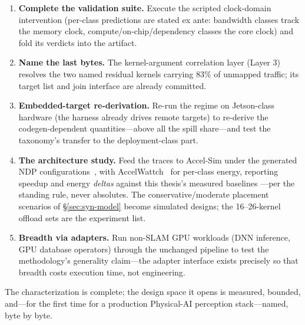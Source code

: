 \begin{enumerate}
\item \textbf{Complete the validation suite.} Execute the scripted
clock-domain intervention (per-class predictions are stated ex ante:
bandwidth classes track the memory clock, compute/on-chip/dependency classes
the core clock) and fold its verdicts into the artifact.
\item \textbf{Name the last bytes.} The kernel-argument correlation layer
(Layer 3) resolves the two named residual kernels carrying 83\% of unmapped
traffic; its target list and join interface are already committed.
\item \textbf{Embedded-target re-derivation.} Re-run the regime on
Jetson-class hardware (the harness already drives remote targets) to
re-derive the codegen-dependent quantities---above all the spill share---and
test the taxonomy's transfer to the deployment-class part.
\item \textbf{The architecture study.} Feed the traces to Accel-Sim under
the generated NDP configurations~\cite{khairy2020accelsim}, with
AccelWattch~\cite{kandiah2021accelwattch} for per-class energy, reporting
speedup and energy \emph{deltas} against this thesis's measured baselines
---per the standing rule, never absolutes. The conservative/moderate
placement scenarios of \S\ref{sec:syn-model} become simulated designs; the
16--26-kernel offload sets are the experiment list.
\item \textbf{Breadth via adapters.} Run non-SLAM GPU workloads (DNN
inference, GPU database operators) through the unchanged pipeline to test
the methodology's generality claim---the adapter interface exists precisely
so that breadth costs execution time, not engineering.
\end{enumerate}

The characterization is complete; the design space it opens is measured,
bounded, and---for the first time for a production Physical-AI perception
stack---named, byte by byte.
